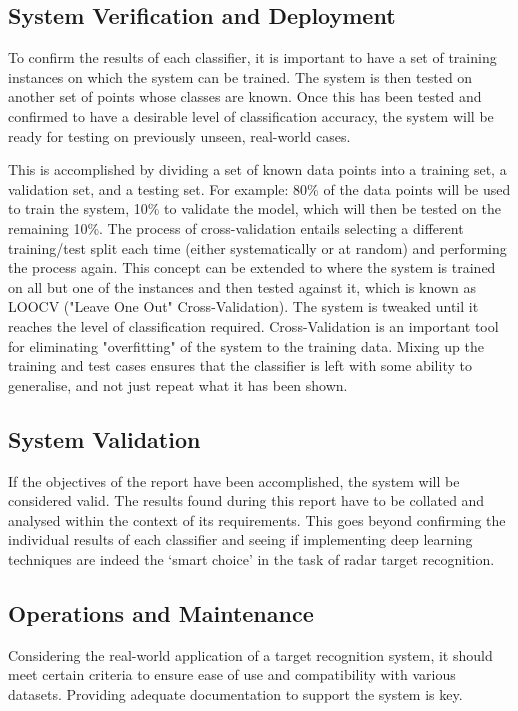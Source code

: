 \subsection{System Verification and Deployment}
To confirm the results of each classifier, it is important to have a set of training instances on which the system can be trained. The system is then tested on another set of points whose classes are known. Once this has been tested and confirmed to have a desirable level of classification accuracy, the system will be ready for testing on previously unseen, real-world cases. 

This is accomplished by dividing a set of known data points into a training set, a validation set, and a testing set. For example: 80\% of the data points will be used to train the system, 10\% to validate the model, which will then be tested on the remaining 10\%. The process of cross-validation entails selecting a different training/test split each time (either systematically or at random) and performing the process again. This concept can be extended to where the system is trained on all but one of the instances and then tested against it, which is known as LOOCV ("Leave One Out" Cross-Validation). The system is tweaked until it reaches the level of classification required. Cross-Validation is an important tool for eliminating "overfitting" of the system to the training data. Mixing up the training and test cases ensures that the classifier is left with some ability to generalise, and not just repeat what it has been shown.

\subsection{System Validation}
If the objectives of the report have been accomplished, the system will be considered valid. The results found during this report have to be collated and analysed within the context of its requirements. This goes beyond confirming the individual results of each classifier and seeing if implementing deep learning techniques are indeed the `smart choice' in the task of radar target recognition. 

\subsection{Operations and Maintenance}

Considering the real-world application of a target recognition system, it should meet certain criteria to ensure ease of use and compatibility with various datasets. Providing adequate documentation to support the system is key. 

